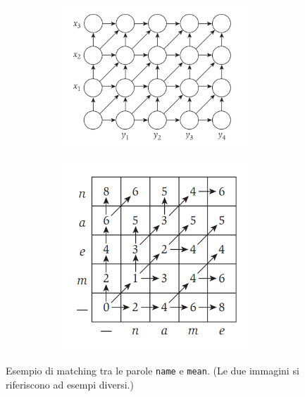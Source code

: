 \begin{figure}[H]
  \begin{subfigure}{\textwidth}
    \centering
    \begin{subfigure}{.5\textwidth}
      \centering
      \includegraphics[width=\linewidth, keepaspectratio]{capitoli/programmazione_dinamica/imgs/sa.png}
    \end{subfigure}%
    \begin{subfigure}{.5\textwidth}
      \centering
      \includegraphics[width=.8\linewidth, keepaspectratio]{capitoli/programmazione_dinamica/imgs/seqalignmatrix.png}
    \end{subfigure}%
  \end{subfigure}
  \caption{Esempio di matching tra le parole \texttt{name} e \texttt{mean}.
    (Le due immagini si riferiscono ad esempi diversi.)}
\end{figure}

